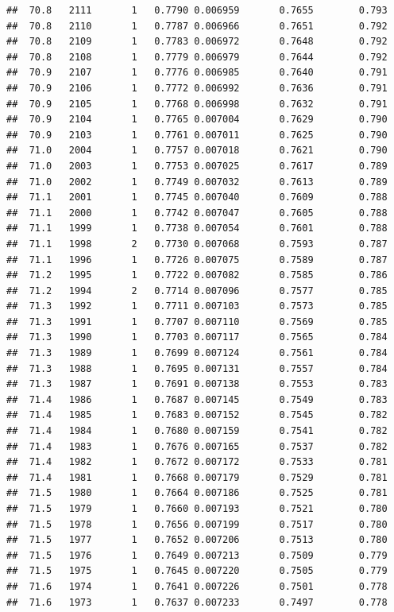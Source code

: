 \documentclass[
]{book}
\begin{document}
\begin{verbatim}
##  70.8   2111       1   0.7790 0.006959       0.7655        0.793
##  70.8   2110       1   0.7787 0.006966       0.7651        0.792
##  70.8   2109       1   0.7783 0.006972       0.7648        0.792
##  70.8   2108       1   0.7779 0.006979       0.7644        0.792
##  70.9   2107       1   0.7776 0.006985       0.7640        0.791
##  70.9   2106       1   0.7772 0.006992       0.7636        0.791
##  70.9   2105       1   0.7768 0.006998       0.7632        0.791
##  70.9   2104       1   0.7765 0.007004       0.7629        0.790
##  70.9   2103       1   0.7761 0.007011       0.7625        0.790
##  71.0   2004       1   0.7757 0.007018       0.7621        0.790
##  71.0   2003       1   0.7753 0.007025       0.7617        0.789
##  71.0   2002       1   0.7749 0.007032       0.7613        0.789
##  71.1   2001       1   0.7745 0.007040       0.7609        0.788
##  71.1   2000       1   0.7742 0.007047       0.7605        0.788
##  71.1   1999       1   0.7738 0.007054       0.7601        0.788
##  71.1   1998       2   0.7730 0.007068       0.7593        0.787
##  71.1   1996       1   0.7726 0.007075       0.7589        0.787
##  71.2   1995       1   0.7722 0.007082       0.7585        0.786
##  71.2   1994       2   0.7714 0.007096       0.7577        0.785
##  71.3   1992       1   0.7711 0.007103       0.7573        0.785
##  71.3   1991       1   0.7707 0.007110       0.7569        0.785
##  71.3   1990       1   0.7703 0.007117       0.7565        0.784
##  71.3   1989       1   0.7699 0.007124       0.7561        0.784
##  71.3   1988       1   0.7695 0.007131       0.7557        0.784
##  71.3   1987       1   0.7691 0.007138       0.7553        0.783
##  71.4   1986       1   0.7687 0.007145       0.7549        0.783
##  71.4   1985       1   0.7683 0.007152       0.7545        0.782
##  71.4   1984       1   0.7680 0.007159       0.7541        0.782
##  71.4   1983       1   0.7676 0.007165       0.7537        0.782
##  71.4   1982       1   0.7672 0.007172       0.7533        0.781
##  71.4   1981       1   0.7668 0.007179       0.7529        0.781
##  71.5   1980       1   0.7664 0.007186       0.7525        0.781
##  71.5   1979       1   0.7660 0.007193       0.7521        0.780
##  71.5   1978       1   0.7656 0.007199       0.7517        0.780
##  71.5   1977       1   0.7652 0.007206       0.7513        0.780
##  71.5   1976       1   0.7649 0.007213       0.7509        0.779
##  71.5   1975       1   0.7645 0.007220       0.7505        0.779
##  71.6   1974       1   0.7641 0.007226       0.7501        0.778
##  71.6   1973       1   0.7637 0.007233       0.7497        0.778

\end{verbatim}
\end{document}
